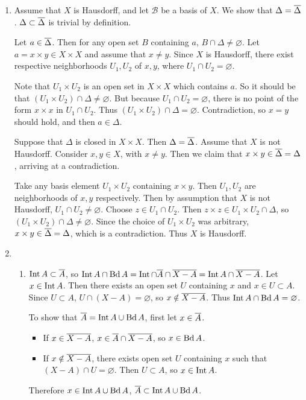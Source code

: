 \documentclass[12pt]{report}
\newcommand{\prob}[1]{\item[\large\textbf{\sffamily #1.}]}
\newcommand{\subprob}[1]{\item[\textbf{\sffamily (#1)}]}
\newcommand{\B}{\mathcal{B}}
\begin{document}
\begin{enumerate}
    \prob{5} Assume that \(X\) is Hausdorff, and let \(\B\) be a basis of \(X\). We show that \(\Delta = \overline{\Delta}\). \(\Delta \subset \overline{\Delta}\) is trivial by definition.

    \bigskip

    Let \(a \in \overline{\Delta}\). Then for any open set \(B\) containing \(a\), \(B \cap \Delta \neq \varnothing\). Let \(a = x \times y \in X\times X\) and assume that \(x \neq y\). Since \(X\) is Hausdorff, there exist respective neighborhoods \(U_1, U_2\) of \(x, y\), where \(U_1 \cap U_2 = \varnothing\).

    Note that \(U_1 \times U_2\) is an open set in \(X \times X\) which contains \(a\). So it should be that \((U_1\times U_2) \cap \Delta \neq \varnothing\). But because \(U_1 \cap U_2 = \varnothing\), there is no point of the form \(x \times x\) in \(U_1 \cap U_2\). Thus \((U_1 \times U_2) \cap \Delta = \varnothing\). Contradiction, so \(x = y\) should hold, and then \(a \in \Delta\).

    \bigskip

    Suppose that \(\Delta\) is closed in \(X \times X\). Then \(\Delta = \overline{\Delta}\). Assume that \(X\) is not Hausdorff. Consider \(x, y \in X\), with \(x \neq y\). Then we claim that \(x \times y \in \overline{\Delta} = \Delta\), arriving at a contradiction.

    Take any basis element \(U_1 \times U_2\) containing \(x \times y\). Then \(U_1, U_2\) are neighborhoods of \(x, y\) respectively. Then by assumption that \(X\) is not Hausdorff, \(U_1 \cap U_2 \neq \varnothing\). Choose \(z \in U_1 \cap U_2\). Then \(z\times z \in U_1 \times U_2 \cap \Delta\), so \((U_1 \times U_2) \cap \Delta \neq \varnothing\). Since the choice of \(U_1 \times U_2\) was arbitrary, \(x\times y \in \overline{\Delta} = \Delta\), which is a contradiction. Thus \(X\) is Hausdorff.

    \prob{6}
    \begin{enumerate}
        \subprob{a} \(\operatorname{Int} A \subset \overline{A}\), so \(\operatorname{Int} A \cap \operatorname{Bd} A = \operatorname{Int} \cap \overline{A} \cap \overline{X - A} = \operatorname{Int} A \cap \overline{X - A}\). Let \(x \in \operatorname{Int} A\). Then there exists an open set \(U\) containing \(x\) and \(x \in U \subset A\). Since \(U \subset A\), \(U \cap (X - A) = \varnothing\), so \(x \notin \overline{X - A}\). Thus \(\operatorname{Int} A \cap \operatorname{Bd} A = \varnothing\).

        \bigskip

        To show that \(\overline{A} = \operatorname{Int} A \cup \operatorname{Bd} A\), first let \(x \in \overline{A}\).
        \begin{itemize}
            \item If \(x \in \overline{X - A}\), \(x \in \overline{A} \cap \overline{X - A}\), so \(x \in \operatorname{Bd} A\).
            \item If \(x \notin \overline{X - A}\), there exists open set \(U\) containing \(x\) such that \((X - A) \cap U = \varnothing\). Then \(U \subset A\), so \(x \in \operatorname{Int} A\).
        \end{itemize}
        Therefore \(x \in \operatorname{Int} A \cup \operatorname{Bd} A\), \(\overline{A} \subset \operatorname{Int} A \cup \operatorname{Bd} A\).


\end{enumerate}
\end{enumerate}
\end{document}
